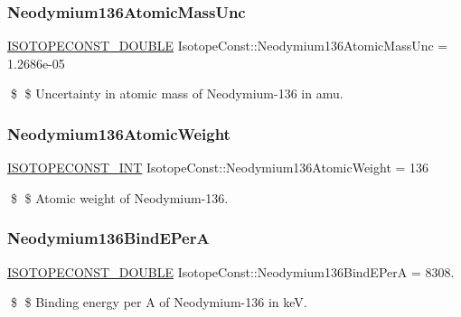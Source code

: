 \subsubsection{\texorpdfstring{Neodymium136\+Atomic\+Mass\+Unc}{Neodymium136AtomicMassUnc}}
{\footnotesize\ttfamily \mbox{\hyperlink{group___isotope_const-_macros_ga8f45a7272ce02c0b4c65c44636ed719a}{I\+S\+O\+T\+O\+P\+E\+C\+O\+N\+S\+T\+\_\+\+D\+O\+U\+B\+LE}} Isotope\+Const\+::\+Neodymium136\+Atomic\+Mass\+Unc = 1.\+2686e-\/05}

\$ \$ Uncertainty in atomic mass of Neodymium-\/136 in amu. \mbox{\label{group___isotope_const-_neodymium-_nd136_gae6296beef6725fde58b57c75c3df08be}} 
\subsubsection{\texorpdfstring{Neodymium136\+Atomic\+Weight}{Neodymium136AtomicWeight}}
{\footnotesize\ttfamily \mbox{\hyperlink{group___isotope_const-_macros_ga5f18360b3e99483a35c32d789e62621c}{I\+S\+O\+T\+O\+P\+E\+C\+O\+N\+S\+T\+\_\+\+I\+NT}} Isotope\+Const\+::\+Neodymium136\+Atomic\+Weight = 136}

\$ \$ Atomic weight of Neodymium-\/136. \mbox{\label{group___isotope_const-_neodymium-_nd136_ga6136611a820f083190bcb501824e2e09}} 
\subsubsection{\texorpdfstring{Neodymium136\+Bind\+E\+PerA}{Neodymium136BindEPerA}}
{\footnotesize\ttfamily \mbox{\hyperlink{group___isotope_const-_macros_ga8f45a7272ce02c0b4c65c44636ed719a}{I\+S\+O\+T\+O\+P\+E\+C\+O\+N\+S\+T\+\_\+\+D\+O\+U\+B\+LE}} Isotope\+Const\+::\+Neodymium136\+Bind\+E\+PerA = 8308.}

\$ \$ Binding energy per A of Neodymium-\/136 in keV. \mbox{\label{group___isotope_const-_neodymium-_nd136_gab4272ee33f865346ee8e09addb4345bf}} 
